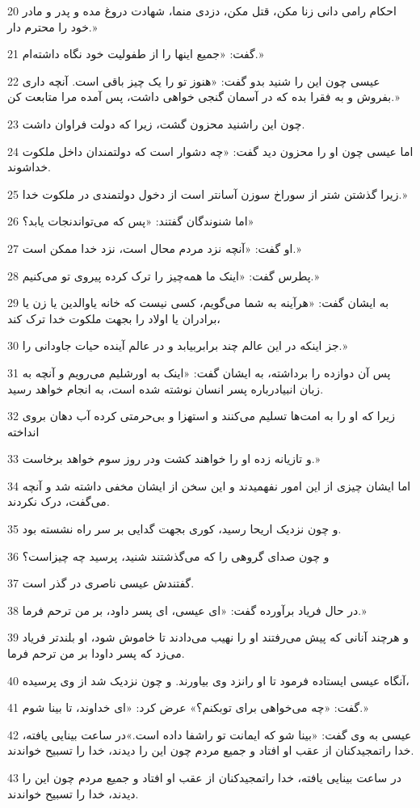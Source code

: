 \par 20 احکام رامی دانی زنا مکن، قتل مکن، دزدی منما، شهادت دروغ مده و پدر و مادر خود را محترم دار.»
\par 21 گفت: «جمیع اینها را از طفولیت خود نگاه داشته‌ام.»
\par 22 عیسی چون این را شنید بدو گفت: «هنوز تو را یک چیز باقی است. آنچه داری بفروش و به فقرا بده که در آسمان گنجی خواهی داشت، پس آمده مرا متابعت کن.»
\par 23 چون این راشنید محزون گشت، زیرا که دولت فراوان داشت.
\par 24 اما عیسی چون او را محزون دید گفت: «چه دشوار است که دولتمندان داخل ملکوت خداشوند.
\par 25 زیرا گذشتن شتر از سوراخ سوزن آسانتر است از دخول دولتمندی در ملکوت خدا.»
\par 26 اما شنوندگان گفتند: «پس که می‌تواندنجات یابد؟»
\par 27 او گفت: «آنچه نزد مردم محال است، نزد خدا ممکن است.»
\par 28 پطرس گفت: «اینک ما همه‌چیز را ترک کرده پیروی تو می‌کنیم.»
\par 29 به ایشان گفت: «هرآینه به شما می‌گویم، کسی نیست که خانه یاوالدین یا زن یا برادران یا اولاد را بجهت ملکوت خدا ترک کند،
\par 30 جز اینکه در این عالم چند برابربیابد و در عالم آینده حیات جاودانی را.»
\par 31 پس آن دوازده را برداشته، به ایشان گفت: «اینک به اورشلیم می‌رویم و آنچه به زبان انبیادرباره پسر انسان نوشته شده است، به انجام خواهد رسید.
\par 32 زیرا که او را به امت‌ها تسلیم می‌کنند و استهزا و بی‌حرمتی کرده آب دهان بروی انداخته
\par 33 و تازیانه زده او را خواهند کشت ودر روز سوم خواهد برخاست.»
\par 34 اما ایشان چیزی از این امور نفهمیدند و این سخن از ایشان مخفی داشته شد و آنچه می‌گفت، درک نکردند.
\par 35 و چون نزدیک اریحا رسید، کوری بجهت گدایی بر سر راه نشسته بود.
\par 36 و چون صدای گروهی را که می‌گذشتند شنید، پرسید چه چیزاست؟
\par 37 گفتندش عیسی ناصری در گذر است.
\par 38 در حال فریاد برآورده گفت: «ای عیسی، ای پسر داود، بر من ترحم فرما.»
\par 39 و هرچند آنانی که پیش می‌رفتند او را نهیب می‌دادند تا خاموش شود، او بلندتر فریاد می‌زد که پسر داودا بر من ترحم فرما.
\par 40 آنگاه عیسی ایستاده فرمود تا او رانزد وی بیاورند. و چون نزدیک شد از وی پرسیده،
\par 41 گفت: «چه می‌خواهی برای توبکنم؟» عرض کرد: «ای خداوند، تا بینا شوم.»
\par 42 عیسی به وی گفت: «بینا شو که ایمانت تو راشفا داده است.»در ساعت بینایی یافته، خدا راتمجید‌کنان از عقب او افتاد و جمیع مردم چون این را دیدند، خدا را تسبیح خواندند.
\par 43 در ساعت بینایی یافته، خدا راتمجید‌کنان از عقب او افتاد و جمیع مردم چون این را دیدند، خدا را تسبیح خواندند.

